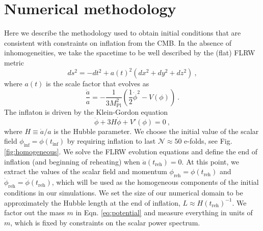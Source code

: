 \documentclass[
    reprint,
    preprintnumbers,
    superscriptaddress,
    nofootinbib,
     amsmath,amssymb,
     aps,
     prd,
    floatfix,
    ]{revtex4-2}
\newcommand{\mpl}{M_\mathrm{Pl}}
\newcommand{\reh}{_\mathrm{reh}}
\begin{document}



\newpage
\clearpage

\appendix



\section{Numerical methodology}
\label{app:numerics}

Here we describe the methodology used to obtain initial conditions that are consistent with constraints on inflation from the CMB. In the absence of inhomogeneities, we take the spacetime to be well described by the (flat) FLRW metric
\begin{equation}
    ds^2 = -dt^2 + a(t)^2(dx^2 + dy^2 + dz^2)~,
\end{equation}
where $a(t)$ is the scale factor that evolves as
\begin{equation}\label{eq:flrw}
    \frac{\ddot{a}}{a} = -\frac{1}{3\mpl^2}\left(\frac{1}{2}\dot{\phi}^2 -V(\phi)\right)~.
\end{equation}
The inflaton is driven by the Klein-Gordon equation
\begin{equation}\label{eq:kg}
    \ddot{\phi} + 3H\dot{\phi} + V'(\phi) = 0~,
\end{equation}
where $H\equiv \dot{a}/a$ is the Hubble parameter. We choose the initial value of the scalar field $\phi_\mathrm{inf}=\phi(t_\mathrm{inf})$ by requiring inflation to last $\mathcal{N}\approx 50$ e-folds, see Fig. \ref{fig:homogeneous}. We solve the FLRW evolution equations and define the end of inflation (and beginning of reheating) when $\ddot{a}(t\reh)=0$. At this point, we extract the values of the scalar field and momentum $\phi\reh = \phi(t\reh)$ and $\dot{\phi}\reh= \dot{\phi}(t\reh)$, which will be used as the homogeneous components of the initial conditions in our simulations. We set the size of our numerical domain to be approximately the Hubble length at the end of inflation, $L\approx H(t\reh)^{-1}$. We factor out the mass $m$ in Eqn. \eqref{eq:potential} and measure everything in units of $m$, which is fixed by constraints on the scalar power spectrum.
\end{document}
